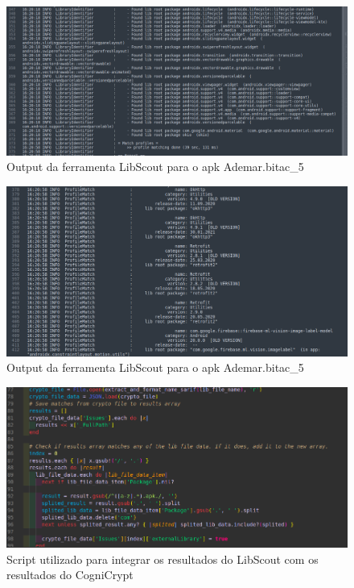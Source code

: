 \begin{figure}[!ht]
  \centering
  \includegraphics[scale=0.4]{img/libscout_output.png}
  \caption{Output da ferramenta LibScout para o apk Ademar.bitac\_5}
  \label{img: libscout_output}
\end{figure}

\FloatBarrier

\begin{figure}[!ht]
  \centering
  \includegraphics[scale=0.4]{img/libscout_output2.png}
  \caption{Output da ferramenta LibScout para o apk Ademar.bitac\_5}
  \label{img: libscout_output2}
\end{figure}

\FloatBarrier

\begin{figure}[!ht]
  \centering
  \includegraphics[scale=0.5]{img/integration_script_cogni.png}
  \caption{Script utilizado para integrar os resultados do LibScout com os resultados do CogniCrypt}
  \label{img: integration_script_cogni}
\end{figure}

